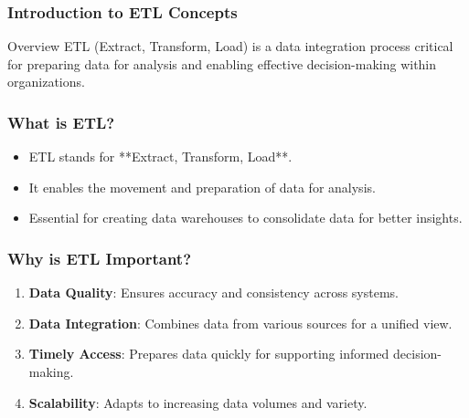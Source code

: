 \documentclass[aspectratio=169]{beamer}
\begin{document}
\frame{\titlepage}

\begin{frame}[fragile]
    \frametitle{Introduction to ETL Concepts}
    \begin{block}{Overview}
        ETL (Extract, Transform, Load) is a data integration process critical for preparing data for analysis and enabling effective decision-making within organizations.
    \end{block}
\end{frame}

\begin{frame}[fragile]
    \frametitle{What is ETL?}
    \begin{itemize}
        \item ETL stands for **Extract, Transform, Load**.
        \item It enables the movement and preparation of data for analysis.
        \item Essential for creating data warehouses to consolidate data for better insights.
    \end{itemize}
\end{frame}

\begin{frame}[fragile]
    \frametitle{Why is ETL Important?}
    \begin{enumerate}
        \item \textbf{Data Quality}: Ensures accuracy and consistency across systems.
        \item \textbf{Data Integration}: Combines data from various sources for a unified view.
        \item \textbf{Timely Access}: Prepares data quickly for supporting informed decision-making.
        \item \textbf{Scalability}: Adapts to increasing data volumes and variety.
    \end{enumerate}
\end{frame}
\end{document}
